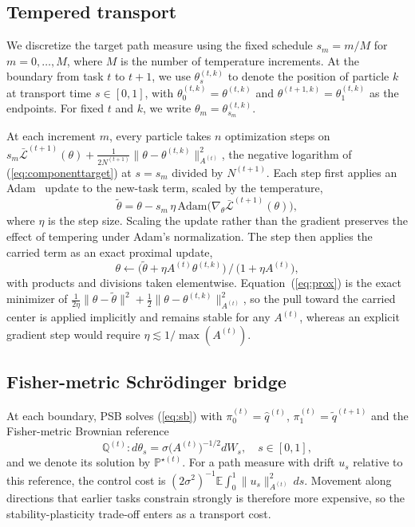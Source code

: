 \documentclass{article}
\begin{document}
\subsection{Tempered transport}
\label{sec:transport}

We discretize the target path measure using the fixed schedule $s_m=m/M$ for
$m=0,\ldots,M$, where $M$ is the number of temperature increments. At the
boundary from task $t$ to $t+1$, we use $\theta^{(t,k)}_s$ to denote the
position of particle $k$ at transport time $s\in[0,1]$, with
$\theta^{(t,k)}_0=\theta^{(t,k)}$ and $\theta^{(t+1,k)}=\theta^{(t,k)}_1$ as the
endpoints. For fixed $t$ and $k$, we write $\theta_m=\theta^{(t,k)}_{s_m}$.

At each increment $m$, every particle takes $n$ optimization steps on
$s_m\bar{\mathcal L}^{(t+1)}(\theta)
+\tfrac{1}{2N^{(t+1)}}\|\theta-\theta^{(t,k)}\|^2_{A^{(t)}}$, the negative
logarithm of (\ref{eq:componenttarget}) at $s=s_m$ divided by $N^{(t+1)}$. Each step first
applies an Adam~\cite{kingma2017adammethodstochasticoptimization} update to the new-task term, scaled by the
temperature,
\begin{equation}
    \tilde\theta=\theta-s_m\,\eta\,\mathrm{Adam}\big(\nabla_\theta\bar{\mathcal L}^{(t+1)}(\theta)\big),
    \label{eq:datastep}
\end{equation}
where $\eta$ is the step size. Scaling the update rather than the gradient preserves the effect of tempering under Adam's normalization. The step then applies the carried term as an exact proximal update,
\begin{equation}
    \theta\leftarrow\big(\tilde\theta+\eta A^{(t)}\theta^{(t,k)}\big)
                     \,/\,\big(1+\eta A^{(t)}\big),
    \label{eq:prox}
\end{equation}
with products and divisions taken elementwise. Equation~(\ref{eq:prox}) is the
exact minimizer of
$\tfrac{1}{2\eta}\|\theta-\tilde\theta\|^2+
\tfrac12\|\theta-\theta^{(t,k)}\|_{A^{(t)}}^2$, so the pull toward the carried
center is applied implicitly and remains stable for any $A^{(t)}$, whereas an
explicit gradient step would require $\eta\lesssim1/\max(A^{(t)})$.


\subsection{Fisher-metric Schr\"odinger bridge}
\label{sec:bridge}

At each boundary, PSB solves (\ref{eq:sb}) with $\pi^{(t)}_0=\hat q^{(t)}$,
$\pi^{(t)}_1=\tilde q^{(t+1)}$ and the Fisher-metric Brownian reference
\begin{equation}
    \mathbb{Q}^{(t)}: d\theta_s=\sigma\big(A^{(t)}\big)^{-1/2}dW_s,
    \quad s\in[0,1],
    \label{eq:fisherreference}
\end{equation}
and we denote its solution by $\mathbb{P}^{\star(t)}$. For a path measure with
drift $u_s$ relative to this reference, the control cost is
$(2\sigma^2)^{-1}\mathbb{E}\int_0^1\|u_s\|_{A^{(t)}}^2\,ds$. Movement along
directions that earlier tasks constrain strongly is therefore more expensive, so
the stability-plasticity trade-off enters as a transport cost.
\end{document}
